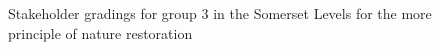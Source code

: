 \documentclass[
  12pt,
  letterpaper,
  DIV=11,
  numbers=noendperiod]{scrartcl}
\begin{document}
\begin{figure}[H]


\caption{\label{fig-SomMoreG3}Stakeholder gradings for group 3 in the
Somerset Levels for the more principle of nature restoration}

\end{figure}%
\end{document}
